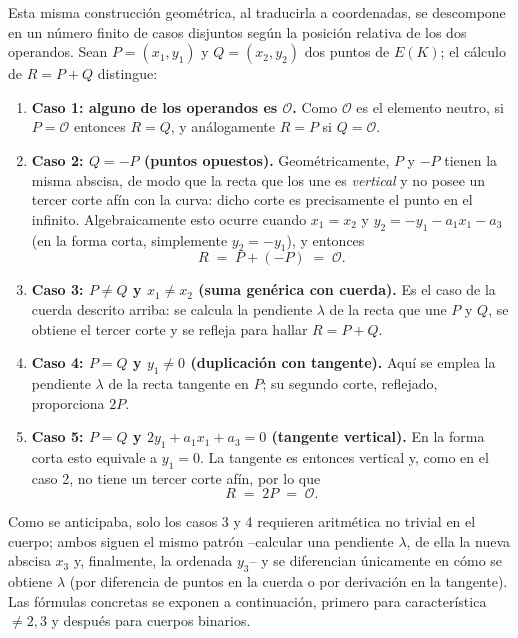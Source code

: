 \noindent Esta misma construcción geométrica, al traducirla a coordenadas, se descompone en un número finito de casos disjuntos según la posición relativa 
de los dos operandos. Sean \(P=(x_1,y_1)\) y \(Q=(x_2,y_2)\) dos puntos de \(E(K)\); el cálculo de \(R = P+Q\) distingue:

\begin{enumerate}
  \item \textbf{Caso 1: alguno de los operandos es \(\mathcal{O}\).} Como \(\mathcal{O}\) es el elemento neutro, si \(P=\mathcal{O}\) entonces \(R = Q\), y análogamente \(R = P\) si \(Q=\mathcal{O}\).

  \item \textbf{Caso 2: \(Q = -P\) (puntos opuestos).} Geométricamente, \(P\) y \(-P\) tienen la misma abscisa, de modo que la recta que los une es \emph{vertical} y no posee un tercer corte afín con la curva: dicho corte es precisamente el punto en el infinito. Algebraicamente esto ocurre cuando \(x_1 = x_2\) y \(y_2 = -y_1 - a_1 x_1 - a_3\) (en la forma corta, simplemente \(y_2 = -y_1\)), y entonces
    \[
      R \;=\; P + (-P) \;=\; \mathcal{O}.
    \]

  \item \textbf{Caso 3: \(P\neq Q\) y \(x_1\neq x_2\) (suma genérica con cuerda).} Es el caso de la cuerda descrito arriba: se calcula la pendiente \(\lambda\) de la recta que une \(P\) y \(Q\), se obtiene el tercer corte y se refleja para hallar \(R = P+Q\).

  \item \textbf{Caso 4: \(P = Q\) y \(y_1\neq 0\) (duplicación con tangente).} Aquí se emplea la pendiente \(\lambda\) de la recta tangente en \(P\); su segundo corte, reflejado, proporciona \(2P\).

  \item \textbf{Caso 5: \(P = Q\) y \(2y_1 + a_1 x_1 + a_3 = 0\) (tangente vertical).} En la forma corta esto equivale a \(y_1 = 0\). La tangente es entonces vertical y, como en el caso 2, no tiene un tercer corte afín, por lo que
    \[
      R \;=\; 2P \;=\; \mathcal{O}.
    \]
\end{enumerate}

\noindent Como se anticipaba, solo los casos 3 y 4 requieren aritmética no trivial en el cuerpo; ambos siguen el mismo patrón --calcular una pendiente \(\lambda\), de ella la nueva abscisa \(x_3\) y, finalmente, la ordenada \(y_3\)-- y se diferencian únicamente en cómo se obtiene \(\lambda\) (por diferencia de puntos en la cuerda o por derivación en la tangente). Las fórmulas concretas se exponen a continuación, primero para característica \(\neq 2,3\) y después para cuerpos binarios.


